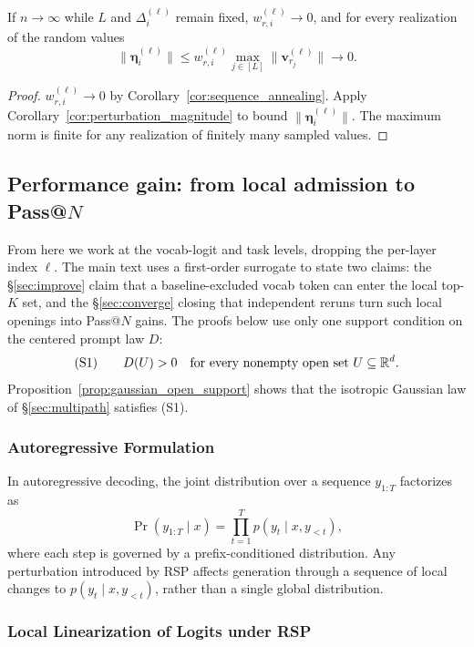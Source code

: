 \begin{corollary}\label{cor:vanishing_perturbation}
If $n\to\infty$ while $L$ and $\Delta_i^{(\ell)}$ remain fixed, $w_{r,i}^{(\ell)}\to 0$, and for every realization of the random values
\[
\|\boldsymbol{\eta}_i^{(\ell)}\|
\le
w_{r,i}^{(\ell)} \max_{j \in [L]} \|\mathbf{v}_{r_j}^{(\ell)}\|
\to
0.
\]
\end{corollary}

\begin{proof}
$w_{r,i}^{(\ell)}\to 0$ by Corollary~\ref{cor:sequence_annealing}. Apply Corollary~\ref{cor:perturbation_magnitude} to bound $\|\boldsymbol{\eta}_i^{(\ell)}\|$. The maximum norm is finite for any realization of finitely many sampled values.
\end{proof}

\subsection{Performance gain: from local admission to Pass@$N$}

From here we work at the vocab-logit and task levels, dropping the per-layer index $\ell$. The main text uses a first-order surrogate to state two claims: the \S\ref{sec:improve} claim that a baseline-excluded vocab token can enter the local top-$K$ set, and the \S\ref{sec:converge} closing that independent reruns turn such local openings into Pass@$N$ gains. The proofs below use only one support condition on the centered prompt law $D$:
\[
\textnormal{(S1)}\qquad D(U) > 0 \quad \text{for every nonempty open set } U \subseteq \mathbb{R}^d.
\]
Proposition~\ref{prop:gaussian_open_support} shows that the isotropic Gaussian law of §\ref{sec:multipath} satisfies (S1).

\subsubsection{Autoregressive Formulation}

In autoregressive decoding, the joint distribution over a sequence $y_{1:T}$ factorizes as
\[
\Pr(y_{1:T} \mid x) = \prod_{t=1}^T p(y_t \mid x, y_{<t}),
\]
where each step is governed by a prefix-conditioned distribution. Any perturbation introduced by RSP affects generation through a sequence of local changes to $p(y_t \mid x, y_{<t})$, rather than a single global distribution.

\subsubsection{Local Linearization of Logits under RSP}

